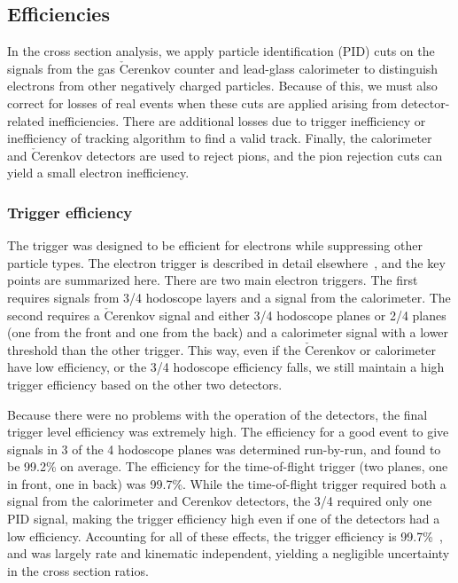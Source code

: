 \subsection{Efficiencies}

In the cross section analysis, we apply particle identification (PID) cuts on
the signals from the gas $\mathrm{\check{C}erenkov}$ counter and lead-glass
calorimeter to distinguish electrons from other negatively charged particles.
Because of this, we must also correct for losses of real events when these
cuts are applied arising from detector-related inefficiencies. There are
additional losses due to trigger inefficiency or inefficiency of tracking
algorithm to find a valid track.  Finally, the calorimeter and
$\mathrm{\check{C}erenkov}$ detectors are used to reject pions, and the 
pion rejection cuts can yield a small electron inefficiency.

\subsubsection{Trigger efficiency}\label{trigeff.sssec}

The trigger was designed to be efficient for electrons while suppressing other
particle types. The electron trigger is described in detail
elsewhere~\cite{blok08, johna_thesis, aji_thesis}, and the key points are
summarized here. There are two main electron triggers. The first requires
signals from 3/4 hodoscope layers and a signal from the calorimeter. 
The second requires a $\mathrm{\check{C}erenkov}$ signal and either 3/4
hodoscope planes or 2/4 planes (one from the front and one from the back) and a
calorimeter signal with a lower threshold than the other trigger. This way,
even if the $\mathrm{\check{C}erenkov}$ or calorimeter have low efficiency, or
the 3/4 hodoscope efficiency falls, we still maintain a high trigger
efficiency based on the other two detectors.

Because there were no problems with the operation of the detectors, the
final trigger level efficiency was extremely high. The efficiency for
a good event to give signals in 3 of the 4 hodoscope planes was determined
run-by-run, and found to be 99.2\% on average.  The efficiency for the 
time-of-flight trigger (two planes, one in front, one in back) was 99.7\%.
While the time-of-flight trigger required both a signal from the calorimeter
and Cerenkov detectors, the 3/4 required only one PID signal, making the
trigger efficiency high even if one of the detectors had a low efficiency.
Accounting for all of these effects, the trigger efficiency is
99.7\%~\cite{aji_thesis}, and was largely rate and kinematic independent,
yielding a negligible uncertainty in the cross section ratios.


